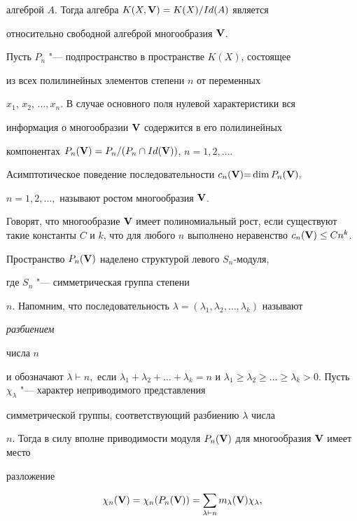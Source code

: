 алгеброй $A$. Тогда алгебра $K(X,{\bf V})=K(X)/Id(A)$ является

относительно свободной алгеброй многообразия ${\bf V}$.



Пусть $P_n$ "--- подпространство в пространстве $K(X)$, состоящее

из всех полилинейных элементов степени $n$ от переменных

$x_1$, $x_2$, $\dots,x_n$. В случае основного поля нулевой характеристики вся

информация о многообразии ${\bf V}$ содержится в его полилинейных

компонентах $P_n({\bf V})=P_n/(P_n \cap Id({\bf V}))$, $n=1, 2, \dots$.

Асимптотическое поведение последовательности $c_n({\bf V}){=}\mathop{\rm dim} P_n({\bf V}),$

$n=1, 2, \dots,$ называют ростом многообразия ${\bf V}$. 

Говорят, что многообразие ${\bf V}$ имеет полиномиальный рост, если существуют такие константы $C$ и $k$, что для любого $n$ выполнено неравенство $c_n({\bf V})\le Cn^k$.



Пространство $P_n({\bf V})$ наделено структурой левого $S_n$-модуля,

 где $S_n$ "--- симметрическая группа степени

 $n$. Напомним, что последовательность $\lambda=

(\lambda_1,\lambda_2, \dots ,\lambda_k)$ называют {\it разбиением

числа $n$} и обозначают $\lambda \vdash n,$ если $\lambda_1 +

\lambda_2+  \dots  + \lambda_k=n$ и $\lambda_1\ge \lambda_2 \ge

 \dots  \ge \lambda_k>0.$ Пусть $\chi_{\lambda}$ "--- характер неприводимого представления

симметрической группы, соответствующий разбиению $\lambda$ числа

$n$. Тогда в силу вполне приводимости модуля $P_n({\bf V})$ для многообразия ${\bf V}$ имеет место

разложение

\begin{equation}

\label{dop10}

   \chi_n({\bf V})=\chi_n(P_n({\bf V})) = \sum_{\lambda \vdash n}m_{\lambda}({\bf V}) \chi_{\lambda},

\end{equation}


